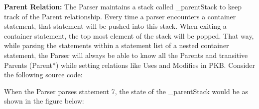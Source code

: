 \documentclass[12pt]{article}
\begin{document}
\newpage
\textbf{Parent Relation:} The Parser maintains a stack called \_parentStack to keep track of the Parent relationship. Every time a parser encounters a container statement, that statement will be pushed into this stack. When exiting a container statement, the top most element of the stack will be popped. That way, while parsing the statements within a statement list of a nested container statement, the Parser will always be able to know all the Parents and transitive Parents (Parent*) while setting relations like Uses and Modifies in PKB.
Consider the following source code:
\begin{center}
\end{center}
\vspace{10mm}
When the Parser parses statement 7, the state of the \_parentStack would be as shown in the figure below:
\end{document}
